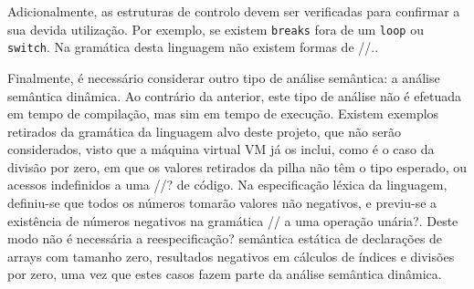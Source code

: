Adicionalmente, as estruturas de controlo devem ser verificadas para confirmar
a sua devida utilização.  Por exemplo, se existem \texttt{breaks} fora de um
\texttt{loop} ou \texttt{switch}. Na gramática desta linguagem não existem
formas de //..

Finalmente, é necessário considerar outro tipo de análise semântica: a análise
semântica dinâmica.  Ao contrário da anterior, este tipo de análise não
é efetuada em tempo de compilação, mas sim em tempo de execução. Existem
exemplos retirados da gramática da linguagem alvo deste projeto, que não serão
considerados, visto que a máquina virtual VM já os inclui, como é o caso da
divisão por zero, em que os valores retirados da pilha não têm o tipo esperado,
ou acessos indefinidos a uma //? de código. Na especificação léxica da
linguagem, definiu-se que todos os números tomarão valores não negativos,
e previu-se a existência de números negativos na gramática // a uma operação
unária?.  Deste modo não é necessária a reespecificação? semântica estática de
declarações de arrays com tamanho zero, resultados negativos em cálculos de
índices e divisões por zero, uma vez que estes casos fazem parte da análise
semântica dinâmica.












